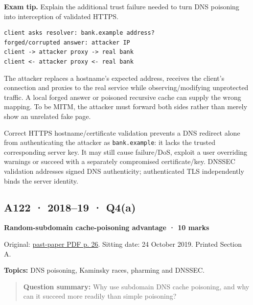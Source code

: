 \documentclass[11pt,a4paper]{article}
\begin{document}
{\color{ForestGreen}\textbf{Exam tip.} Explain the additional trust failure needed to turn DNS poisoning into interception of validated HTTPS.}



\begin{Verbatim}[breaklines=true,breakanywhere=true,fontsize=\small,frame=single,rulecolor=\color{PanelBorder}]
client asks resolver: bank.example address?
forged/corrupted answer: attacker IP
client -> attacker proxy -> real bank
client <- attacker proxy <- real bank
\end{Verbatim}

The attacker replaces a hostname's expected address,\allowbreak{} receives the client's connection and proxies to the real service while observing/\allowbreak{}modifying unprotected traffic. A local forged answer or poisoned recursive cache can supply the wrong mapping. To be MITM,\allowbreak{} the attacker must forward both sides rather than merely show an unrelated fake page.


Correct HTTPS hostname/\allowbreak{}certificate validation prevents a DNS redirect alone from authenticating the attacker as \texttt{bank.\allowbreak{}example}: it lacks the trusted corresponding server key. It may still cause failure/\allowbreak{}DoS,\allowbreak{} exploit a user overriding warnings or succeed with a separately compromised certificate/\allowbreak{}key. DNSSEC validation addresses signed DNS authenticity; authenticated TLS independently binds the server identity.




\clearpage
\subsection{A122 · 2018–19 · Q4(a)}\label{a122}

\textbf{Random-subdomain cache-poisoning advantage · 10 marks}


Original: \href{../../CSE405-Security_Merged.pdf\#page=26}{past-paper PDF p. 26}. Sitting date: 24 October 2019. Printed Section A.


\textbf{Topics:} DNS poisoning,\allowbreak{} Kaminsky races,\allowbreak{} pharming and DNSSEC.



\begin{quote}\small

\textbf{Question summary:} Why use subdomain DNS cache poisoning,\allowbreak{} and why can it succeed more readily than simple poisoning?



\end{quote}
\end{document}
